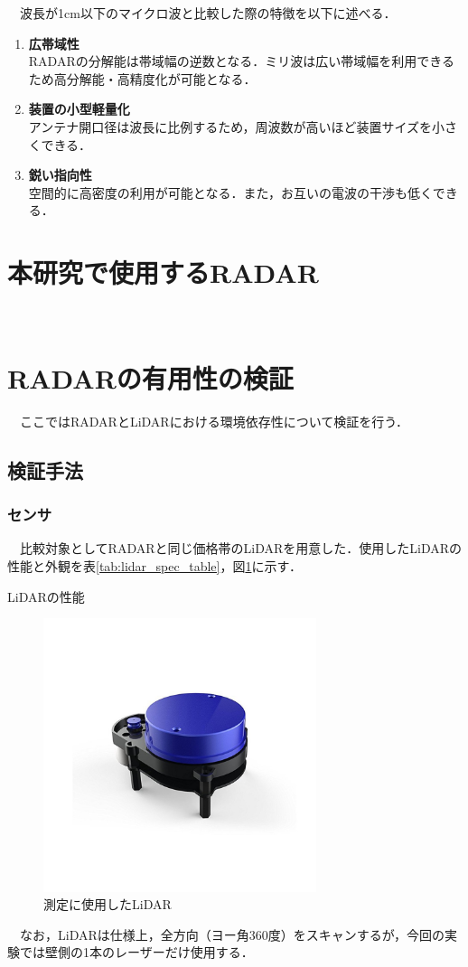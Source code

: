 　波長が1cm以下のマイクロ波と比較した際の特徴を以下に述べる\cite{feature_RadioWaves}．
\begin{enumerate}
    \item \textbf{広帯域性}\\
        RADARの分解能は帯域幅の逆数となる．ミリ波は広い帯域幅を利用できるため高分解能・高精度化が可能となる．
    \item \textbf{装置の小型軽量化}\\
        アンテナ開口径は波長に比例するため，周波数が高いほど装置サイズを小さくできる．
    \item \textbf{鋭い指向性}\\
        空間的に高密度の利用が可能となる．また，お互いの電波の干渉も低くできる．
\end{enumerate}


\section{本研究で使用するRADAR}
　

\section{RADARの有用性の検証}
　ここではRADARとLiDARにおける環境依存性について検証を行う．

\subsection{検証手法}
\subsubsection{センサ}
　比較対象としてRADARと同じ価格帯のLiDARを用意した．使用したLiDARの性能と外観を表\ref{tab:lidar_spec_table}，図\ref{fig:lidar}に示す．\cite{lidar_datasheet}

\begin{table}[htbp]
    \centering
    \caption{LiDARの性能}
    
    \label{tab:lidar_spec_table}
\end{table}

\begin{figure}[H]
    \centering
    \includegraphics[width=8cm]{./fig/lidar.jpg}
    \caption{測定に使用したLiDAR}
    \label{fig:lidar}
\end{figure}
　なお，LiDARは仕様上，全方向（ヨー角360度）をスキャンするが，今回の実験では壁側の1本のレーザーだけ使用する．

